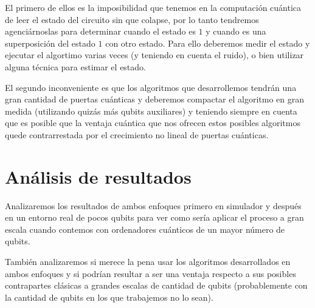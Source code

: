 El primero de ellos es la imposibilidad que tenemos en la computación cuántica de leer el estado del circuito sin que colapse, por lo tanto tendremos agenciárnoslas para determinar cuando el estado es $1$ y cuando es una superposición del estado $1$ con otro estado.
Para ello deberemos medir el estado y ejecutar el algortimo varias veces (y teniendo en cuenta el ruido), o bien utilizar alguna técnica para estimar el estado.

El segundo inconveniente es que los algoritmos que desarrollemos tendrán una gran cantidad de puertas cuánticas y deberemos compactar el algoritmo en gran medida (utilizando quizás más qubits auxiliares) y teniendo siempre en cuenta que es posible que la ventaja cuántica que nos ofrecen estos posibles algoritmos quede contrarrestada por el crecimiento no lineal de puertas cuánticas.


\section{Análisis de resultados}
Analizaremos los resultados de ambos enfoques primero en simulador y después en un entorno real de pocos qubits para ver como sería aplicar el proceso a gran escala cuando contemos con ordenadores cuánticos de un mayor número de qubits.

También analizaremos si merece la pena usar los algoritmos desarrollados en ambos enfoques y si podrían resultar a ser una ventaja respecto a sus posibles contrapartes clásicas a grandes escalas de cantidad de qubits (probablemente con la cantidad de qubits en los que trabajemos no lo sean). 